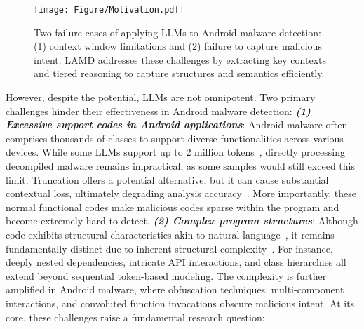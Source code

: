 \begin{figure}[t]
    \centering
    \texttt{[image: Figure/Motivation.pdf]}
    \caption{Two failure cases of applying LLMs to Android malware detection: (1) context window limitations and (2) failure to capture malicious intent. LAMD addresses these challenges by extracting key contexts and tiered reasoning to capture structures and semantics efficiently.}
    \label{fig:motivation}
\end{figure}


However, despite the potential, LLMs are not omnipotent. Two primary challenges hinder their effectiveness in Android malware detection: \textit{\textbf{(1) Excessive support codes in Android applications}}: Android malware often comprises thousands of classes to support diverse functionalities across various devices. 
While some LLMs support up to 2 million tokens~\cite{gemini1.5}, directly processing decompiled malware remains impractical, as some samples would still exceed this limit.
Truncation offers a potential alternative, but it can cause substantial contextual loss, ultimately degrading analysis accuracy~\cite{truncate}.
More importantly, these normal functional codes make malicious codes sparse within the program and become extremely hard to detect. 
\textit{\textbf{(2) Complex program structures}}: Although code exhibits structural characteristics akin to natural language~\cite{naturalness}, it remains fundamentally distinct due to inherent structural complexity~\cite{codeandnatural}. 
For instance, deeply nested dependencies, intricate API interactions, and class hierarchies all extend beyond sequential token-based modeling. 
The complexity is further amplified in Android malware, where obfuscation techniques, multi-component interactions, and convoluted function invocations obscure malicious intent. 
At its core, these challenges raise a fundamental research question: 
\begin{center}
\end{center}

